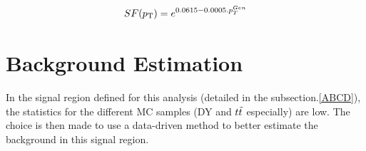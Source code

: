 \documentclass{cernatlasnote}
\begin{document}
            \begin{equation}
                SF(p_{\text T}) = e^{0.0615-0.0005.p^{Gen}_T}
            \end{equation}
\newpage
\section{Background Estimation}
\label{SEC: BKGEST}
 In the signal region defined for this analysis (detailed in the subsection.\ref{ABCD}), the statistics for the different MC samples (DY and $t\Tilde{t}$ especially) are low. The choice is then made to use a data-driven method to better estimate the background in this signal region.
\end{document}
